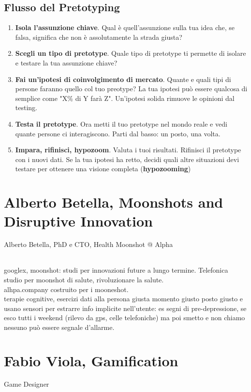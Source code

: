 \documentclass[10pt]{article}
\begin{document}
\subsection{Flusso del Pretotyping}
\begin{enumerate}
\item \textbf{Isola l'assunzione chiave}. Qual è quell'assunzione sulla tua idea che, se falsa, significa che non è assolutamente la strada giusta?
\item \textbf{Scegli un tipo di pretotype}. Quale tipo di pretotype ti permette di isolare e testare la tua assunzione chiave?
\item \textbf{Fai un'ipotesi di coinvolgimento di mercato}. Quante e quali tipi di persone faranno quello col tuo preotype? La tua ipotesi può essere qualcosa di semplice come "X\% di Y farà Z". Un'ipotesi solida rimuove le opinioni dal testing.
\item \textbf{Testa il pretotype}. Ora metti il tuo pretotype nel mondo reale e vedi quante persone ci interagiscono. Parti dal basso: un posto, una volta.
\item \textbf{Impara, rifinisci, hypozoom}. Valuta i tuoi risultati. Rifinisci il pretotype con i nuovi dati. Se la tua ipotesi ha retto, decidi quali altre situazioni devi testare per ottenere una visione completa (\textbf{hypozooming})
\end{enumerate}
\pagebreak
\section{Alberto Betella, Moonshots and Disruptive Innovation}
\begin{scriptsize}
Alberto Betella, PhD e CTO, Health Moonshot @ Alpha\\\\
\end{scriptsize}
googlex, moonshot: studi per innovazioni future a lungo termine. Telefonica studio per moonshot di salute, rivoluzionare la salute.\\
alhpa.company costruito per i mooneshot.\\
terapie cognitive, esercizi dati alla persona giusta momento giusto posto giusto e usano sensori per estrarre info implicite nell'utente: es segni di pre-depressione, se esco tutti i weekend (rilevo da gps, celle telefoniche) ma poi smetto e non chiamo nessuno può essere segnale d'allarme.
\section{Fabio Viola, Gamification}
Game Designer
\end{document}
